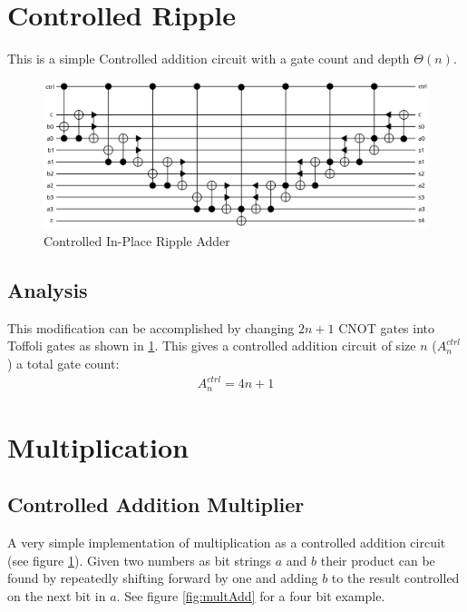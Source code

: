 \section{Controlled Ripple}
    This is a simple Controlled addition circuit with a gate count and depth $\Theta(n)$.
    \begin{figure}[ht]
      \capstart
      \centering
      \includegraphics[width=\textwidth]{images/4BitRippleAdderCtrl} 
      \caption{Controlled In-Place Ripple Adder}
      \label{fig:ctrlRipple}
    \end{figure}
    \subsection{Analysis}
      This modification can be accomplished by changing $2n+1$ CNOT gates into Toffoli gates as shown in \cref{fig:ctrlRipple}.
 		  This gives a controlled addition circuit of size $n$ ($A^{ctrl}_n$) a total gate count:
      \begin{align} \label{eq:cadd}
        A^{ctrl}_n = 4n+1
      \end{align}


\section{Multiplication}
  \subsection{Controlled Addition Multiplier}
    A very simple implementation of multiplication as a controlled addition circuit (see figure \ref{fig:ctrlRipple}).  
    Given two numbers as bit strings $a$ and $b$ their product can be found by repeatedly shifting forward by one and adding $b$ to the result controlled on the next bit in $a$.
    See figure \ref{fig:multAdd} for a four bit example.

